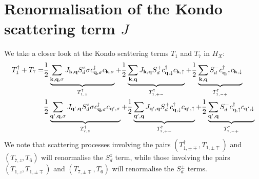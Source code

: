 \documentclass{revtex4-2}
\begin{document}
\section{Renormalisation of the Kondo scattering term \(J\)}
We take a closer look at the Kondo scattering terms \(T_1\) and \(T_7\) in \(H_X\):
\begin{equation}\begin{aligned}
	T_1^\dagger + T_7 =& \frac{1}{2}\underbrace{\sum_{{\bf k},{\bf q},\sigma}J_{{\bf k},{\bf q}}S_d^z \sigma c^\dagger_{{\bf q},\sigma} c_{{\bf k},\sigma}}_{T_{1,z}^\dagger} + \frac{1}{2}\underbrace{\sum_{{\bf k},{\bf q}}J_{{\bf k},{\bf q}} S_d^+ c^\dagger_{{\bf q},\downarrow} c_{{\bf k},\uparrow}}_{T_{1,+-}^\dagger} + \frac{1}{2}\underbrace{\sum_{{\bf k},{\bf q}}S_d^- c^\dagger_{{\bf q},\uparrow} c_{{\bf k},\downarrow}}_{T_{1,-+}^\dagger} \\
			   &\frac{1}{2}\underbrace{\sum_{{\bf q}^\prime,{\bf q},\sigma}J_{{\bf q}^\prime,{\bf q}}S_d^z \sigma c^\dagger_{{\bf q},\sigma} c_{{\bf q}^\prime,\sigma}}_{T_{7,z}^\dagger} + \frac{1}{2}\underbrace{\sum_{{\bf q}^\prime,{\bf q}}J_{{\bf q}^\prime,{\bf q}} S_d^+ c^\dagger_{{\bf q},\downarrow} c_{{\bf q}^\prime,\uparrow}}_{T_{7,+-}^\dagger} + \frac{1}{2}\underbrace{\sum_{{\bf q}^\prime,{\bf q}}S_d^- c^\dagger_{{\bf q},\uparrow} c_{{\bf q}^\prime,\downarrow}}_{T_{7,-+}^\dagger}
\end{aligned}\end{equation}
We note that scattering processes involving the pairs \(\left(T_{1,\pm \mp}^\dagger, T_{1,\pm \mp}\right)\) and \(\left(T_{7,z}, T_6\right) \) will renormalise the \(S_d^z\) term, while those involving the pairs \(\left(T_{1,z}, T_{1,\pm \mp}\right)\) and \(\left(T_{7,\pm \mp}, T_6\right)\) will renormalise the \(S_d^\pm\) terms. 
\end{document}
